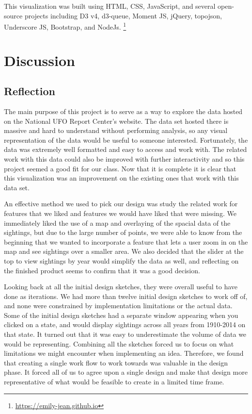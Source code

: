 \documentclass[journal]{vgtc}                %
\begin{document}
This visualization was built using HTML, CSS, JavaScript, and several open-source projects including D3 v4, d3-queue, Moment JS, jQuery, topojson, Underscore JS, Bootstrap, and NodeJs. \footnote{\url{https://emily-jean.github.io}}

\section{Discussion}
\subsection{Reflection}
The main purpose of this project is to serve as a way to explore the data hosted on the National UFO Report Center's website. The data set hosted there is massive and hard to understand without performing analysis, so any visual representation of the data would be useful to someone interested. Fortunately, the data was extremely well formatted and easy to access and work with. The related work with this data could also be improved with further interactivity and so this project seemed a good fit for our class. Now that it is complete it is clear that this visualization was an improvement on the existing ones that work with this data set. 

An effective method we used to pick our design was study the related work for features that we liked and features we would have liked that were missing. We immediately liked the use of a map and overlaying of the spacial data of the sightings, but due to the large number of points, we were able to know from the beginning that we wanted to incorporate a feature that lets a user zoom in on the map and see sightings over a smaller area. We also decided that the slider at the top to view sightings by year would simplify the data as well, and reflecting on the finished product seems to confirm that it was a good decision. 

Looking back at all the initial design sketches, they were overall useful to have done as iterations. We had more than twelve initial design sketches to work off of, and none were constrained by implementation limitations or the actual data. Some of the initial design sketches had a separate window appearing when you clicked on a state, and would display sightings across all years from 1910-2014 on that state. It turned out that it was easy to underestimate the volume of data we would be representing. Combining all the sketches forced us to focus on what limitations we might encounter when implementing an idea. Therefore, we found that creating a single work flow to work towards was valuable in the design phase. It forced all of us to agree upon a single design and make that design more representative of what would be feasible to create in a limited time frame. 
\end{document}
